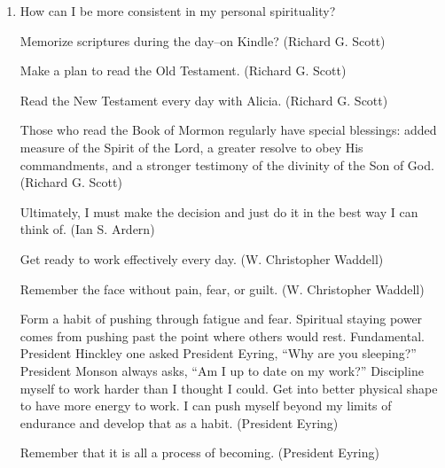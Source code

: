 \begin{enumerate}
Consider the lessons learned and gifts obtained in my mission. How can I apply them more in post-mission life? (W. Christopher Waddell)

Remember the face without pain, fear, or guilt. (W. Christopher Waddell)

Prepare others to return to God's presence with me. (President Eyring)

Make the decision to stand alone, if necessary, in defense of the church and gospel. (President Monson)

Look for a calling card to call Mirzhi. (President Monson)

Read the Book of Mormon--focus on the Atonement--hope through it for eternal life. (Tad R. Callister)

Organize the Book of Mormon reading for our Sunday school class. This will require me to be organized, and I will have to make it a priority every week. If it's going to happen, I have to stay on top of it.

Work on loving Alicia. The mission can't be had again but I can create that type of life and relationship with my wife. (Elaine S. Dalton)

Don't compromise the desire for eternal life by doing things that I know will hurt my spirituality. (President Monson)

Desire--ask and it shall be given; in other words I need to make sure to keep praying for it. (Dallin H. Oaks)

\item How can I be more consistent in my personal spirituality?

Memorize scriptures during the day--on Kindle? (Richard G. Scott)

Make a plan to read the Old Testament. (Richard G. Scott)

Read the New Testament every day with Alicia. (Richard G. Scott)

Those who read the Book of Mormon regularly have special blessings: added measure of the Spirit of the Lord, a greater resolve to obey His commandments, and a stronger testimony of the divinity of the Son of God. (Richard G. Scott)

Ultimately, I must make the decision and just do it in the best way I can think of. (Ian S. Ardern)

Get ready to work effectively every day. (W. Christopher Waddell)

Remember the face without pain, fear, or guilt. (W. Christopher Waddell)

Form a habit of pushing through fatigue and fear. Spiritual staying power comes from pushing past the point where others would rest. Fundamental. President Hinckley one asked President Eyring, ``Why are you sleeping?'' President Monson always asks, ``Am I up to date on my work?'' Discipline myself to work harder than I thought I could. Get into better physical shape to have more energy to work. I can push myself beyond my limits of endurance and develop that as a habit. (President Eyring)

Remember that it is all a process of becoming. (President Eyring)

\end{enumerate}

